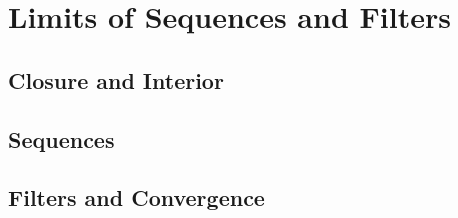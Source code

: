 \chapter{Limits of Sequences and Filters}

\section{Closure and Interior}



\section{Sequences}










\section{Filters and Convergence}

